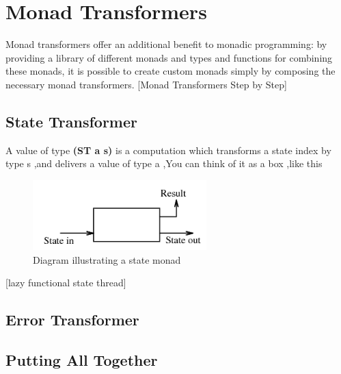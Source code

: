 \chapter{Monad Transformers}

Monad transformers offer an additional benefit to monadic programming: by providing a
library of different monads and types and functions for combining these monads, it is possible
to create custom monads simply by composing the necessary monad transformers. [Monad Transformers Step by Step]

\section{State Transformer}
A value of type \textbf{(ST a s)} is a computation which transforms a state index by type s ,and delivers a value of type a ,You can think of it as a box ,like this 

\begin{figure}[H]
  \centering
	\includegraphics[width=0.60\textwidth]{pic/c3/state.png}
	\caption{Diagram illustrating a state monad}
\end{figure}
[lazy functional state thread]


\section{Error Transformer}


\section{Putting All Together}